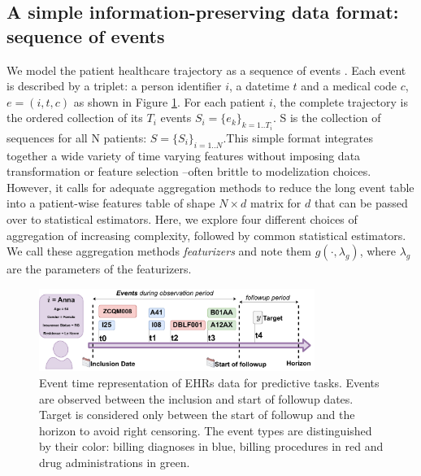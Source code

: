 \documentclass[french,12pt,twoside,a4paper]{book}
\begin{document}
\subsection{A simple information-preserving data format: sequence of events}%
\label{subsec:predictive_models:event_format}%
We model the patient healthcare trajectory as a sequence of events
\citep{beam2019clinical, bacry2020scalpel3, chazard2022book}. Each event is
described by a triplet: a person identifier $i$, a datetime $t$ and a medical
code $c$, $e = (i, t, c)$ as shown in Figure \ref{fig:ehr_prediction_timeline}.
For each patient $i$, the complete trajectory is the ordered collection of its
$T_i$ events $S_i = \{e_k\}_{k=1..T_i}$. S is the collection of sequences for
all N patients: $S = \{S_i\}_{i=1..N}$.This simple format integrates together a
wide variety of time varying features without imposing data transformation or
feature selection --often brittle to modelization choices. However, it calls for
adequate aggregation methods to reduce the long event table into a patient-wise
features table of shape $N \times d$ matrix for $d$  that can be passed over to
statistical estimators.
Here, we explore four different choices of aggregation of increasing
complexity, followed by common statistical estimators. We call these aggregation
methods \emph{featurizers} and note them $g(\cdot, \lambda_g)$, where
$\lambda_g$ are the parameters of the featurizers.

\begin{figure}
  \centering
  \includegraphics[width=0.8\textwidth]{img/chapter_3/ehr_trajectory_predictive.pdf}
  \caption{Event time representation of EHRs data for predictive tasks. Events
    are observed between the inclusion and start of followup dates. Target is
    considered only between the start of followup and the horizon to avoid right
    censoring. The event types are distinguished by their color: billing
    diagnoses in blue, billing procedures in red and drug administrations in
    green.}\label{fig:ehr_prediction_timeline}
\end{figure}
\end{document}
